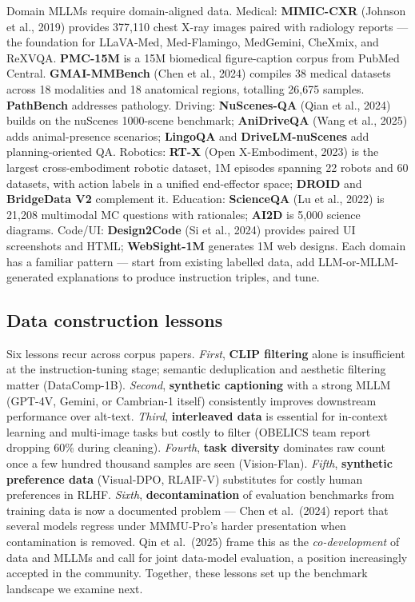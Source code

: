 Domain MLLMs require domain-aligned data. Medical: \textbf{MIMIC-CXR} (Johnson et al., 2019) provides 377,110 chest X-ray images paired with radiology reports --- the foundation for LLaVA-Med, Med-Flamingo, MedGemini, CheXmix, and ReXVQA. \textbf{PMC-15M} is a 15M biomedical figure-caption corpus from PubMed Central. \textbf{GMAI-MMBench} (Chen et al., 2024) compiles 38 medical datasets across 18 modalities and 18 anatomical regions, totalling 26,675 samples. \textbf{PathBench} addresses pathology. Driving: \textbf{NuScenes-QA} (Qian et al., 2024) builds on the nuScenes 1000-scene benchmark; \textbf{AniDriveQA} (Wang et al., 2025) adds animal-presence scenarios; \textbf{LingoQA} and \textbf{DriveLM-nuScenes} add planning-oriented QA. Robotics: \textbf{RT-X} (Open X-Embodiment, 2023) is the largest cross-embodiment robotic dataset, 1M episodes spanning 22 robots and 60 datasets, with action labels in a unified end-effector space; \textbf{DROID} and \textbf{BridgeData V2} complement it. Education: \textbf{ScienceQA} (Lu et al., 2022) is 21,208 multimodal MC questions with rationales; \textbf{AI2D} is 5,000 science diagrams. Code/UI: \textbf{Design2Code} (Si et al., 2024) provides paired UI screenshots and HTML; \textbf{WebSight-1M} generates 1M web designs. Each domain has a familiar pattern --- start from existing labelled data, add LLM-or-MLLM-generated explanations to produce instruction triples, and tune.

\subsection{Data construction lessons}\label{data-construction-lessons}

Six lessons recur across corpus papers. \emph{First}, \textbf{CLIP filtering} alone is insufficient at the instruction-tuning stage; semantic deduplication and aesthetic filtering matter (DataComp-1B). \emph{Second}, \textbf{synthetic captioning} with a strong MLLM (GPT-4V, Gemini, or Cambrian-1 itself) consistently improves downstream performance over alt-text. \emph{Third}, \textbf{interleaved data} is essential for in-context learning and multi-image tasks but costly to filter (OBELICS team report dropping 60\% during cleaning). \emph{Fourth}, \textbf{task diversity} dominates raw count once a few hundred thousand samples are seen (Vision-Flan). \emph{Fifth}, \textbf{synthetic preference data} (Visual-DPO, RLAIF-V) substitutes for costly human preferences in RLHF. \emph{Sixth}, \textbf{decontamination} of evaluation benchmarks from training data is now a documented problem --- Chen et al.~(2024) report that several models regress under MMMU-Pro's harder presentation when contamination is removed. Qin et al.~(2025) frame this as the \emph{co-development} of data and MLLMs and call for joint data-model evaluation, a position increasingly accepted in the community. Together, these lessons set up the benchmark landscape we examine next.

